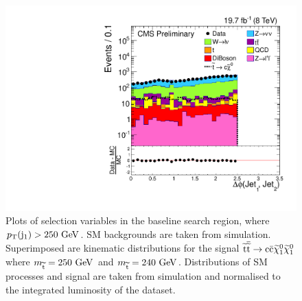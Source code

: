 \begin{figure}
\begin{center}
   \includegraphics[scale=0.32]     {Figures/sus13009/cut/dPhi_Jet1_Jet2.pdf}
   \caption{Plots of selection variables in the baseline search region, where $p_{\text{T}}({\rm j}_1)>250~\mathrm{GeV}$. \ac{SM} backgrounds are taken from simulation. Superimposed are kinematic distributions for the signal $\widetilde{{\rm t}} \overline{\widetilde{\mathrm{t}}} \rightarrow \rm c \bar{\rm c} \widetilde{\chi}^{0}_{1} \widetilde{\chi}^{0}_{1}$ where $m_{\widetilde{{\rm t}}} = 250~\mathrm{GeV}$ and $m_{\widetilde{{\rm t}}} = 240~\mathrm{GeV}$. 
   Distributions of \ac{SM} processes and signal are taken from simulation and normalised to the integrated luminosity of the dataset.
         \label{fig:nplots}}
  \end{center}
\end{figure}




